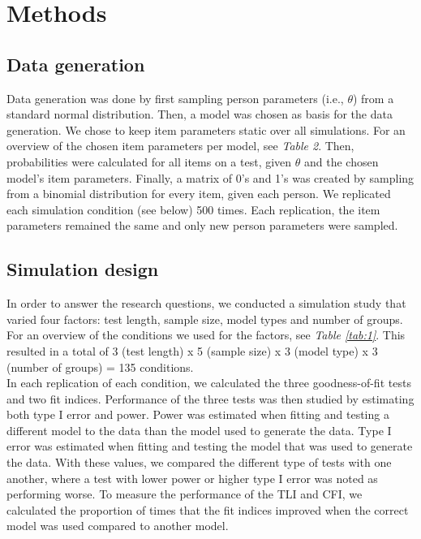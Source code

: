 \documentclass[Royal,sageapa,times,doublespace]{sagej}
\begin{document}
\section{Methods}
\subsection{Data generation}
Data generation was done by first sampling person parameters (i.e., $\theta$) from a standard normal distribution. Then, a model was chosen as basis for the data generation. We chose to keep item parameters static over all simulations. For an overview of the chosen item parameters per model, see \textit{Table 2}. Then, probabilities were calculated for all items on a test, given $\theta$ and the chosen model's item parameters. Finally, a matrix of 0's and 1's was created by sampling from a binomial distribution for every item, given each person. We replicated each simulation condition (see below) 500 times. Each replication, the item parameters remained the same and only new person parameters were sampled.

\subsection{Simulation design}
In order to answer the research questions, we conducted a simulation study that varied four factors: test length, sample size, model types and number of groups. For an overview of the conditions we used for the factors, see \textit{Table \ref{tab:1}}. This resulted in a total of 3 (test length) x 5 (sample size) x 3 (model type) x 3 (number of groups) = 135 conditions. \\
\indent In each replication of each condition, we calculated the three goodness-of-fit tests and two fit indices. Performance of the three tests was then studied by estimating both type I error and power. Power was estimated when fitting and testing a different model to the data than the model used to generate the data. Type I error was estimated when fitting and testing the model that was used to generate the data. With these values, we compared the different type of tests with one another, where a test with lower power or higher type I error was noted as performing worse.
To measure the performance of the TLI and CFI, we calculated the proportion of times that the fit indices improved when the correct model was used compared to another model.
\end{document}
